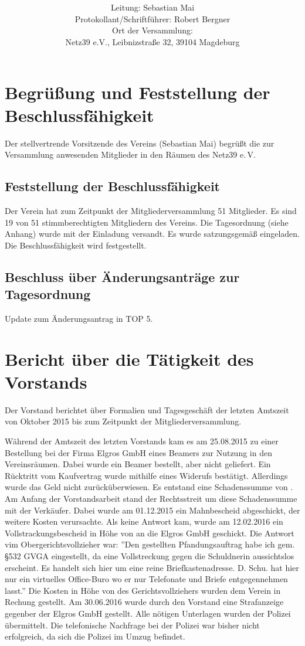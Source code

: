 \documentclass[a4paper,12pt,titlepage]{scrartcl}
\title{ \logo \\ \vspace{0.2\baselineskip} \thetitle}
\author{
Leitung: Sebastian Mai\\
Protokollant/Schriftführer: Robert Bergner \\
Ort der Versammlung:\\ Netz39 e.V., Leibnizstraße 32, 39104 Magdeburg \\
}
\date{\displaydate{date}} %
\begin{document}
\maketitle
\tableofcontents

\clearpage

\section{Begrüßung und Feststellung der Beschlussfähigkeit}
Der stellvertrende Vorsitzende des Vereins (Sebastian Mai) begrüßt die zur Versammlung anwesenden Mitglieder in den Räumen des Netz39 e.\,V.

\subsection{Feststellung der Beschlussfähigkeit}
Der Verein hat zum Zeitpunkt der Mitgliederversammlung 51 Mitglieder. Es sind 19 von 51 stimmberechtigten Mitgliedern des Vereins. Die Tagesordnung (siehe Anhang) wurde mit der Einladung versandt. Es wurde satzungsgemäß eingeladen. Die Beschlussfähigkeit wird festgestellt.

\subsection{Beschluss über Änderungsanträge zur Tagesordnung}
Update zum Änderungsantrag in TOP 5.

\section{Bericht über die Tätigkeit des Vorstands}
Der Vorstand berichtet über Formalien und Tagesgeschäft der letzten Amtszeit von Oktober 2015 bis zum Zeitpunkt der Mitgliederversammlung.

Während der Amtszeit des letzten Vorstands kam es am 25.08.2015 zu einer Bestellung bei der Firma Elgros GmbH eines Beamers zur Nutzung in den Vereinsräumen. Dabei wurde ein Beamer bestellt, aber nicht geliefert. Ein Rücktritt vom Kaufvertrag wurde mithilfe eines Widerufs bestätigt. Allerdings wurde das Geld nicht zurücküberwiesen. Es entstand eine Schadenssumme von . 
Am Anfang der Vorstandsarbeit stand der Rechtsstreit um diese Schadenssumme mit der Verkäufer. Dabei wurde am 01.12.2015 ein Mahnbescheid abgeschickt, der  weitere Kosten verursachte. Als keine Antwort kam, wurde am 12.02.2016 ein Vollstrackungsbescheid in Höhe von  an die Elgros GmbH geschickt. Die Antwort vim Obergerichtsvollzieher war: ''Den gestellten Pfandungsauftrag habe ich gem. §532 GVGA eingestellt, da eine Vollstreckung gegen die Schuldnerin aussichtslos erscheint. Es handelt sich hier um eine reine Briefkastenadresse. D. Schu. hat hier nur ein virtuelles Office-Buro wo er nur Telefonate und Briefe entgegennehmen lasst.''
Die Kosten in Höhe von  des Gerichtsvollziehers wurden dem Verein in Rechung gestellt. Am 30.06.2016 wurde durch den Vorstand eine Strafanzeige gegenber der Elgros GmbH gestellt. Alle nötigen Unterlagen wurden der Polizei übermittelt. Die telefonische Nachfrage bei der Polizei war bisher nicht erfolgreich, da sich die Polizei im Umzug befindet.
\end{document}
